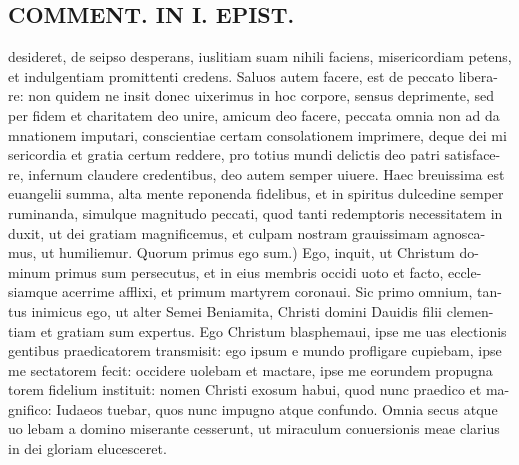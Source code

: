 \documentclass{article}
\begin{document}
\begin{pages}
\section*{COMMENT. IN I. EPIST. }
\marginpar{[ p.476 ]}\pstart desideret, de seipso desperans, iuslitiam suam nihili faciens, misericordiam petens, et indulgentiam promittenti credens. Saluos autem facere, est de peccato libera- re: non quidem ne insit donec uixerimus in hoc corpore, sensus deprimente, sed per fidem et charitatem deo unire, amicum deo facere, peccata omnia non ad da mnationem imputari, conscientiae certam consolationem imprimere, deque dei mi sericordia et gratia certum reddere, pro totius mundi delictis deo patri satisface- re, infernum claudere credentibus, deo autem semper uiuere. Haec breuissima est euangelii summa, alta mente reponenda fidelibus, et in spiritus dulcedine semper ruminanda, simulque magnitudo peccati, quod tanti redemptoris necessitatem in duxit, ut dei gratiam magnificemus, et culpam nostram grauissimam agnosca- mus, ut humiliemur. Quorum primus ego sum.) Ego, inquit, ut Christum do- minum primus sum persecutus, et in eius membris occidi uoto et facto, eccle- siamque acerrime afflixi, et primum martyrem coronaui. Sic primo omnium, tan- tus inimicus ego, ut alter Semei Beniamita, Christi domini Dauidis filii clemen- tiam et gratiam sum expertus. Ego Christum blasphemaui, ipse me uas electionis gentibus praedicatorem transmisit: ego ipsum e mundo profligare cupiebam, ipse me sectatorem fecit: occidere uolebam et mactare, ipse me eorundem propugna torem fidelium instituit: nomen Christi exosum habui, quod nunc praedico et ma- gnifico: Iudaeos tuebar, quos nunc impugno atque confundo. Omnia secus atque uo lebam a domino miserante cesserunt, ut miraculum conuersionis meae clarius in dei gloriam elucesceret.  \pend
{}
{}

\end{pages}
\end{document}
